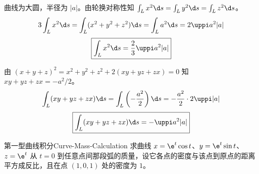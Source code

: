 \begin{solution}
    曲线为大圆，半径为 $|a|$。由轮换对称性知 $\int_{L} x^{2} \d s = \int_{L} y^{2} \d s = \int_{L} z^{2} \d s$。
    \begin{equation}
        3 \int_{L} x^{2} \d s = \int_{L}(x^{2}+y^{2}+z^{2}) \d s = \int_{L} a^{2} \d s = 2 \uppi a^{2} |a|
    \end{equation}
    \begin{equation}
        \boxed{\int_{L} x^{2} \d s = \frac{2}{3} \uppi a^{2} |a|}
    \end{equation}


    由 $(x+y+z)^{2} = x^{2}+y^{2}+z^{2} + 2(xy+yz+zx) = 0$ 知 $xy+yz+zx = -a^{2}/2$。
    \begin{equation}
        \int_{L}(xy+yz+zx) \d s = \int_{L} \left( -\frac{a^{2}}{2} \right) \d s = -\frac{a^{2}}{2} \cdot 2 \uppi |a|
    \end{equation}
    \begin{equation}
        \boxed{\int_{L}(xy+yz+zx) \d s = - \uppi a^{2} |a|}
    \end{equation}
\end{solution}

\begin{problem}{第一型曲线积分}{Curve-Mass-Calculation}
    求曲线 $x = \e^t \cos t$、$y = \e^t \sin t$、$z = \e^t$ 从 $t = 0$ 到任意点间那段弧的质量，设它各点的密度与该点到原点的距离平方成反比，且在点 $(1, 0, 1)$ 处的密度为 $1$。
\end{problem}

